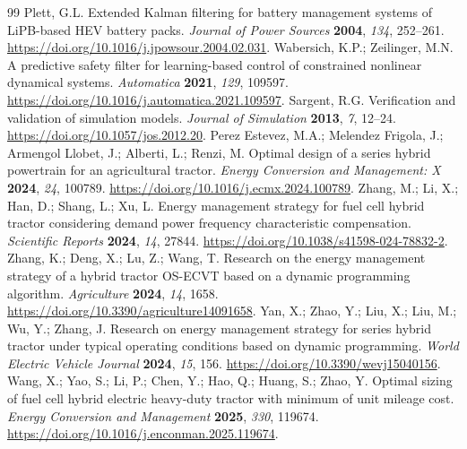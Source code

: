 \begin{thebibliography}{99}
 Plett, G.L. Extended Kalman filtering for battery management systems of LiPB-based HEV battery packs. \emph{Journal of Power Sources} \textbf{2004}, \emph{134}, 252--261. \url{https://doi.org/10.1016/j.jpowsour.2004.02.031}.
 Wabersich, K.P.; Zeilinger, M.N. A predictive safety filter for learning-based control of constrained nonlinear dynamical systems. \emph{Automatica} \textbf{2021}, \emph{129}, 109597. \url{https://doi.org/10.1016/j.automatica.2021.109597}.
 Sargent, R.G. Verification and validation of simulation models. \emph{Journal of Simulation} \textbf{2013}, \emph{7}, 12--24. \url{https://doi.org/10.1057/jos.2012.20}.
 Perez Estevez, M.A.; Melendez Frigola, J.; Armengol Llobet, J.; Alberti, L.; Renzi, M. Optimal design of a series hybrid powertrain for an agricultural tractor. \emph{Energy Conversion and Management: X} \textbf{2024}, \emph{24}, 100789. \url{https://doi.org/10.1016/j.ecmx.2024.100789}.
 Zhang, M.; Li, X.; Han, D.; Shang, L.; Xu, L. Energy management strategy for fuel cell hybrid tractor considering demand power frequency characteristic compensation. \emph{Scientific Reports} \textbf{2024}, \emph{14}, 27844. \url{https://doi.org/10.1038/s41598-024-78832-2}.
 Zhang, K.; Deng, X.; Lu, Z.; Wang, T. Research on the energy management strategy of a hybrid tractor OS-ECVT based on a dynamic programming algorithm. \emph{Agriculture} \textbf{2024}, \emph{14}, 1658. \url{https://doi.org/10.3390/agriculture14091658}.
 Yan, X.; Zhao, Y.; Liu, X.; Liu, M.; Wu, Y.; Zhang, J. Research on energy management strategy for series hybrid tractor under typical operating conditions based on dynamic programming. \emph{World Electric Vehicle Journal} \textbf{2024}, \emph{15}, 156. \url{https://doi.org/10.3390/wevj15040156}.
 Wang, X.; Yao, S.; Li, P.; Chen, Y.; Hao, Q.; Huang, S.; Zhao, Y. Optimal sizing of fuel cell hybrid electric heavy-duty tractor with minimum of unit mileage cost. \emph{Energy Conversion and Management} \textbf{2025}, \emph{330}, 119674. \url{https://doi.org/10.1016/j.enconman.2025.119674}.
\end{thebibliography}
